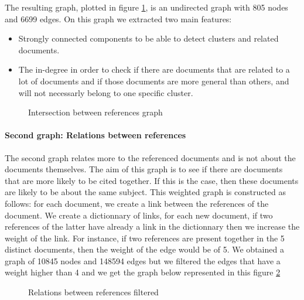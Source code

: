 \documentclass[article,twocolumn]{IEEEtran}
\providecommand{\tightlist}{%
      \setlength{\itemsep}{0pt}\setlength{\parskip}{0pt}}
\begin{document}
    The resulting graph, plotted in figure \ref{intersection}, is an
undirected graph with 805 nodes and 6699 edges. On this graph we
extracted two main features:

\begin{itemize}
\tightlist
\item
  Strongly connected components to be able to detect clusters and
  related documents.
\item
  The in-degree in order to check if there are documents that are
  related to a lot of documents and if those documents are more general
  than others, and will not necessarly belong to one specific cluster.
\end{itemize}


    \begin{figure}
        \begin{center}\end{center}
        \caption{Intersection between references graph}
        \label{intersection}
    \end{figure}
    
    \hypertarget{second-graph-relations-between-references}{%
\paragraph{Second graph: Relations between
references}\label{second-graph-relations-between-references}}

The second graph relates more to the referenced documents and is not
about the documents themselves. The aim of this graph is to see if there
are documents that are more likely to be cited together. If this is the
case, then these documents are likely to be about the same subject. This
weighted graph is constructed as follows: for each document, we create a
link between the references of the document. We create a dictionnary of
links, for each new document, if two references of the latter have
already a link in the dictionnary then we increase the weight of the
link. For instance, if two references are present together in the 5
distinct documents, then the weight of the edge would be of 5. We
obtained a graph of 10845 nodes and 148594 edges but we filtered the
edges that have a weight higher than 4 and we get the graph below
represented in this figure \ref{fig6}




    \begin{figure}
        \begin{center}\end{center}
        \caption{Relations between references filtered}
        \label{fig6}
    \end{figure}
    
\end{document}
